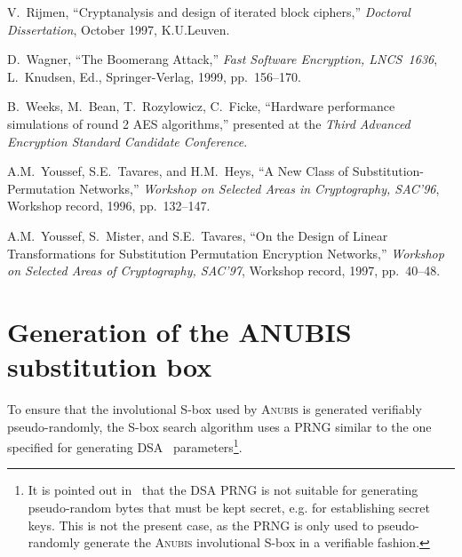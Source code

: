 \documentclass{llncs}
\begin{document}
\begin{thebibliography}{99}

V.~Rijmen, ``Cryptanalysis and design of
iterated block ciphers,'' \emph{Doctoral Dissertation},
October 1997, K.U.Leuven.

D.~Wagner, ``The Boomerang Attack,'' \emph{Fast
Software Encryption, LNCS~1636}, L.~Knudsen, Ed., Springer-Verlag,
1999, pp.~156--170.

 B.~Weeks, M.~Bean, T.~Rozylowicz, C.~Ficke, ``Hardware
performance simulations of round 2 AES algorithms,''
presented at the \emph{Third
Advanced Encryption Standard Candidate Conference}.

A.M.~Youssef, S.E.~Tavares, and
H.M.~Heys, ``A New Class of Substitution-Permutation Networks,''
\emph{Workshop on Selected Areas in Cryptography, SAC'96},
Workshop record, 1996, pp.~132--147.

A.M.~Youssef, S.~Mister, and
S.E.~Tavares, ``On the Design of Linear Transformations for
Substitution Permutation Encryption Networks,'' \emph{Workshop
on Selected Areas of Cryptography, SAC'97}, Workshop record,
1997, pp.~40--48.

\end{thebibliography}

\appendix

\section{Generation of the {A\normalsize NUBIS} substitution box}

To ensure that the involutional S-box used by \textsc{Anubis} is
generated verifiably pseudo-randomly, the S-box search algorithm
uses a PRNG similar to the one specified for generating
DSA~\cite{dsa} parameters\footnote{It is pointed out
in~\cite{counterpane-prng} that the DSA PRNG is not suitable for
generating pseudo-random bytes that must be kept secret, e.g. for
establishing secret keys. This is not the present case, as the
PRNG is only used to pseudo-randomly generate the \textsc{Anubis}
involutional S-box in a verifiable fashion.}.
\end{document}
